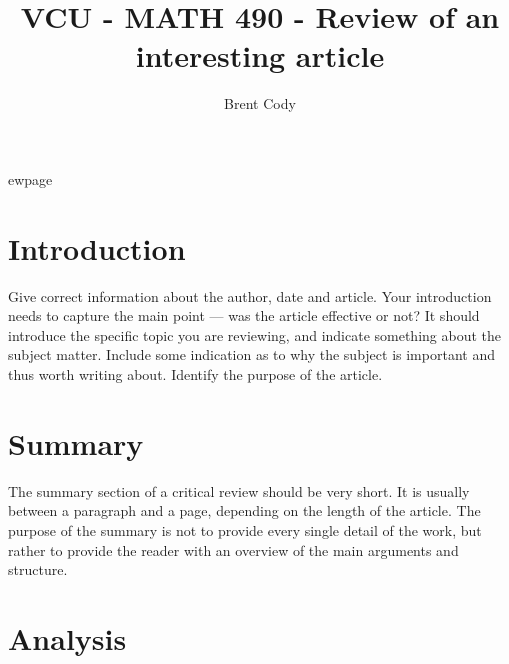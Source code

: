 \documentclass{article}
\begin{document}
\title{VCU - MATH 490 - Review of an interesting article}

\author{Brent Cody}

\maketitle              %




% 
ewpage




\section{Introduction}

Give correct information about the author, date and article. Your introduction needs to capture the main point --- was the article effective or not? It should introduce the specific topic you are reviewing, and indicate something about the subject matter. Include some indication as to why the subject is important and thus worth writing about. Identify the purpose of the article.

\section{Summary}


The summary section of a critical review should be very short. It is usually between a paragraph and a page, depending on the length of the article. The purpose of the summary is not to provide every single detail of the work, but rather to provide the reader with an overview of the main arguments and structure.

\section{Analysis}
\end{document}
